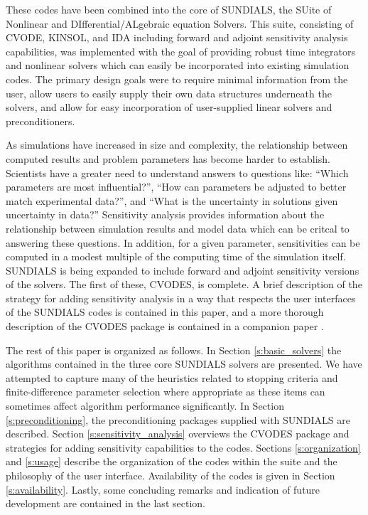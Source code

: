 These codes have been combined into the core of SUNDIALS, the  
SUite of Nonlinear and DIfferential/ALgebraic equation Solvers.  
This suite, consisting of CVODE, KINSOL, and IDA including 
forward and adjoint sensitivity 
analysis capabilities, was implemented with the goal of providing
robust time integrators and nonlinear solvers which can easily be 
incorporated into existing simulation codes.  The primary design 
goals were to require minimal information from the user, allow users 
to easily supply their own data structures underneath the solvers, 
and allow for easy incorporation of user-supplied linear solvers
and preconditioners.

As simulations have increased in size and complexity, the 
relationship between computed results and problem parameters has 
become harder to establish.  Scientists have a greater need to
understand answers to questions like: ``Which parameters are 
most influential?'', ``How can parameters be adjusted to better 
match experimental data?'', and ``What is the uncertainty in solutions 
given uncertainty in data?''  Sensitivity analysis provides 
information about the relationship between simulation results and model 
data which can be critcal to answering these questions.  In addition, for 
a given parameter, sensitivities can be computed in a modest multiple of 
the computing time of the simulation itself.  
SUNDIALS is being expanded to 
include forward and adjoint sensitivity versions of the solvers.
The first of these, CVODES, is complete.  A brief description of the
strategy for adding sensitivity analysis in a way that respects the
user interfaces of the SUNDIALS codes is contained in this paper, and 
a more thorough description of the CVODES package is contained in a 
companion paper \cite{SeHi:03}.

The rest of this paper is organized as follows.  In Section 
\ref{s:basic_solvers} the algorithms contained in the three 
core SUNDIALS solvers are presented.  
We have attempted to capture many of the heuristics related to 
stopping criteria and finite-difference parameter selection
where appropriate as these items 
can sometimes affect algorithm performance significantly.
In Section \ref{s:preconditioning}, the
preconditioning packages supplied with SUNDIALS are
described.  Section \ref{s:sensitivity_analysis} overviews
the CVODES package and strategies for adding sensitivity 
capabilities to the codes.  Sections \ref{s:organization} and 
\ref{s:usage} describe the organization of the codes within the 
suite and the philosophy of the user interface.   
Availability of the codes is given in 
Section \ref{s:availability}.  Lastly, some
concluding remarks and indication of future development
are contained in the last section.



